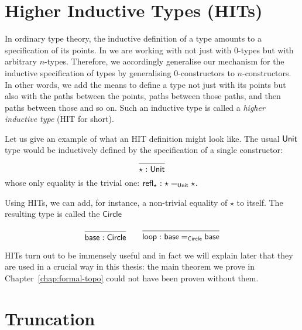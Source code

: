 \section{Higher Inductive Types (HITs)}

In ordinary type theory, the inductive definition of a type amounts to a specification of
its points. In \UF{} we are working with not just with $0$-types but with arbitrary
$n$-types. Therefore, we accordingly generalise our mechanism for the inductive
specification of types by generalising $0$-constructors to $n$-constructors. In other
words, we add the means to define a type not just with its points but also with the paths
between the points, paths between those paths, and then paths between those and so on.
Such an inductive type is called a \emph{higher inductive type} (HIT for short).

Let us give an example of what an HIT definition might look like. The usual $\mathsf{Unit}{}$
type would be inductively defined by the specification of a single constructor:
\begin{equation*}
  \begin{prooftree}
    \infer0{\oftyI{\star}{\unitty{}}}
  \end{prooftree}
\end{equation*}
whose only equality is the trivial one: $\mathsf{refl}_\star\hspace{0.1mm}:\hspace{0.1mm}\star =_{\mathsf{Unit}{}} \star$.

Using HITs, we can add, for instance, a non-trivial equality of $\star$ to itself. The
resulting type is called the $\mathsf{Circle}$

\begin{equation*}
  \begin{prooftree}
    \infer0{\oftyI{\mathsf{base}}{\mathsf{Circle}}}
  \end{prooftree}
  \hspace{2em}
  \begin{prooftree}
    \infer0{\oftyI{\mathsf{loop}}{\mathsf{base} =_{\mathsf{Circle}} \mathsf{base}}}
  \end{prooftree}
\end{equation*}

HITs turn out to be immensely useful and in fact we will explain later that they are used
in a crucial way in this thesis: the main theorem we prove in
Chapter~\ref{chap:formal-topo} could not have been proven without them.

\section{Truncation}

